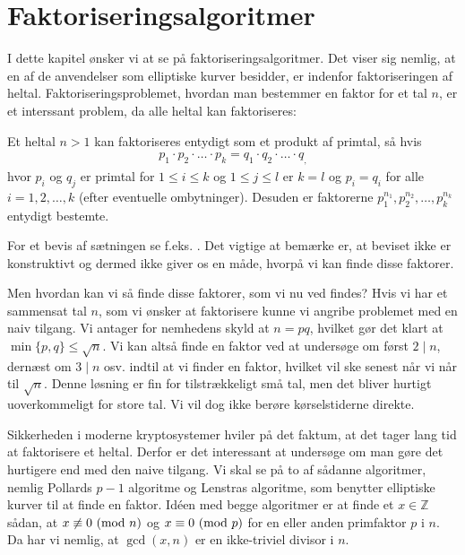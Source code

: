 \chapter{Faktoriseringsalgoritmer}
\label{chap:kapitel_faktorisering}

I dette kapitel ønsker vi at se på faktoriseringsalgoritmer. Det viser sig nemlig, at en af de anvendelser som elliptiske kurver besidder, er indenfor faktoriseringen af heltal. Faktoriseringsproblemet, hvordan man bestemmer en faktor for et tal $n$, er et interssant problem, da alle heltal kan faktoriseres:

\begin{thm}
Et heltal $n > 1$ kan faktoriseres entydigt som et produkt af primtal, så hvis
\begin{align*}
	p_1 \cdot p_2 \cdot \ldots \cdot p_k = q_1 \cdot q_2 \cdot \ldots \cdot q_,
\end{align*}
hvor $p_i$ og $q_j$ er primtal for $1 \leq i \leq k$ og $1 \leq j \leq l$ er $k = l$ og $p_i = q_i$ for alle $i=1, 2, \ldots, k$ (efter eventuelle ombytninger). Desuden er faktorerne $p_{1}^{n_1}, p_{2}^{n_2}, \ldots, p_{k}^{n_k}$ entydigt bestemte.
\end{thm}
For et bevis af sætningen se f.eks. \cite{Hansen}. Det vigtige at bemærke er, at beviset ikke er konstruktivt og dermed ikke giver os en måde, hvorpå vi kan finde disse faktorer. 

Men hvordan kan vi så finde disse faktorer, som vi nu ved findes? Hvis vi har et sammensat tal $n$, som vi ønsker at faktorisere kunne vi angribe problemet med en naiv tilgang. Vi antager for nemhedens skyld at $n = pq$, hvilket gør det klart at $\min \{p, q \} \leq \sqrt{n}$. Vi kan altså finde en faktor ved at undersøge om først $2 \mid n$, dernæst om $3 \mid n$ osv. indtil at vi finder en faktor, hvilket vil ske senest når vi når til $\sqrt{n}$. Denne løsning er fin for tilstrækkeligt små tal, men det bliver hurtigt uoverkommeligt for store tal. Vi vil dog ikke berøre kørselstiderne direkte.

Sikkerheden i moderne kryptosystemer hviler på det faktum, at det tager lang tid at faktorisere et heltal. Derfor er det interessant at undersøge om man gøre det hurtigere end med den naive tilgang. Vi skal se på to af sådanne algoritmer, nemlig Pollards $p-1$ algoritme og Lenstras algoritme, som benytter elliptiske kurver til at finde en faktor. Idéen med begge algoritmer er at finde et $x \in \mathbb{Z}$ sådan, at $x \not \equiv 0 \ (\mathrm{mod} \ n)$ og 
$x \equiv 0 \ (\mathrm{mod} \ p)$ for en eller anden primfaktor $p$ i $n$. Da har vi nemlig, at $\gcd(x, n)$ er en ikke-triviel divisor i $n$.

